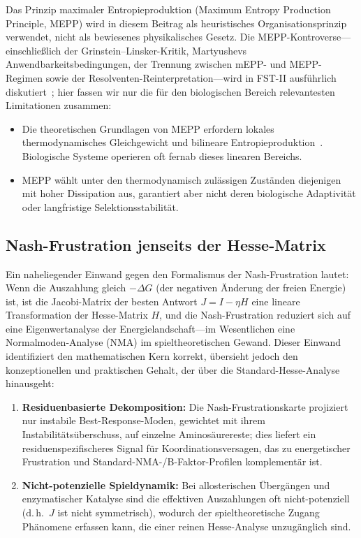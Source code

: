 \documentclass[12pt,a4paper]{article}
\theoremstyle{remark}
\begin{document}
Das Prinzip maximaler Entropieproduktion (Maximum Entropy Production Principle, MEPP) wird in diesem Beitrag als heuristisches Organisationsprinzip verwendet, nicht als bewiesenes physikalisches Gesetz. Die MEPP-Kontroverse---einschließlich der Grinstein--Linsker-Kritik, Martyushevs Anwendbarkeitsbedingungen, der Trennung zwischen mEPP- und MEPP-Regimen sowie der Resolventen-Reinterpretation---wird in FST-II ausführlich diskutiert~\citep{FSTII}; hier fassen wir nur die für den biologischen Bereich relevantesten Limitationen zusammen:
\begin{itemize}
\item Die theoretischen Grundlagen von MEPP erfordern lokales thermodynamisches Gleichgewicht und bilineare Entropieproduktion~\citep{Martyushev2010}. Biologische Systeme operieren oft fernab dieses linearen Bereichs.
\item MEPP wählt unter den thermodynamisch zulässigen Zuständen diejenigen mit hoher Dissipation aus, garantiert aber nicht deren biologische Adaptivität oder langfristige Selektionsstabilität.
\end{itemize}

\subsection{Nash-Frustration jenseits der Hesse-Matrix}

Ein naheliegender Einwand gegen den Formalismus der Nash-Frustration lautet: Wenn die Auszahlung gleich $-\Delta G$ (der negativen Änderung der freien Energie) ist, ist die Jacobi-Matrix der besten Antwort $J = I - \eta H$ eine lineare Transformation der Hesse-Matrix $H$, und die Nash-Frustration reduziert sich auf eine Eigenwertanalyse der Energielandschaft---im Wesentlichen eine Normalmoden-Analyse (NMA) im spieltheoretischen Gewand. Dieser Einwand identifiziert den mathematischen Kern korrekt, übersieht jedoch den konzeptionellen und praktischen Gehalt, der über die Standard-Hesse-Analyse hinausgeht:

\begin{enumerate}
    \item \textbf{Residuenbasierte Dekomposition:} Die Nash-Frustrationskarte projiziert nur instabile Best-Response-Moden, gewichtet mit ihrem Instabilitätsüberschuss, auf einzelne Aminosäurereste; dies liefert ein residuenspezifischeres Signal für Koordinationsversagen, das zu energetischer Frustration und Standard-NMA-/B-Faktor-Profilen komplementär ist.
    \item \textbf{Nicht-potenzielle Spieldynamik:} Bei allosterischen Übergängen und enzymatischer Katalyse sind die effektiven Auszahlungen oft nicht-potenziell (d.\,h.\ $J$ ist nicht symmetrisch), wodurch der spieltheoretische Zugang Phänomene erfassen kann, die einer reinen Hesse-Analyse unzugänglich sind.
\end{enumerate}
\end{document}
